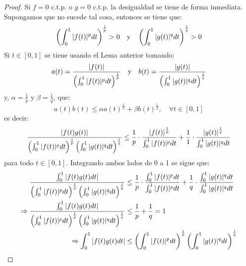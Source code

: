 \documentclass[twoside,12pt,a4 paper,openright]{book}
\begin{document}
\begin{enumerate}
    \begin{proof}
        Si $f=0$ c.t.p. o $g=0$ c.t.p. la desigualdad se tiene de forma inmediata. Supongamos que no sucede tal cosa, entonces se tiene que:
        \begin{equation*}
            \left(\int_0^1|f(t)|^p dt\right) ^{\frac{1}{p}}>0\quad\textup{y}\quad\left(\int_0^1 |g(t)|^q dt\right) ^{\frac{1}{q}}>0
        \end{equation*}
        Si $t\in[0,1]$ se tiene usando el Lema anterior tomando:
        \begin{equation*}
            a(t)=\frac{\left|f(t)\right|}{\left(\int_0^1|f(t)|^p dt\right) ^{\frac{1}{p}}}\quad\textup{y}\quad b(t)=\frac{\left|g(t)\right|}{\left(\int_0^1 |g(t)|^q dt\right) ^{\frac{1}{q}}}
        \end{equation*}
        y, $\alpha=\frac{1}{p}$ y $\beta=\frac{1}{q}$, que:
        \begin{equation*}
            a(t)b(t)\leq\alpha a(t)^{\frac{1}{\alpha}}+\beta b(t)^{\frac{1}{\beta}},\quad\forall t\in[0,1]
        \end{equation*}
        es decir:
        \begin{equation*}
            \frac{\left|f(t)g(t)\right|}{\left(\int_0^1|f(t)|^p dt\right) ^{\frac{1}{p}}\left(\int_0^1 |g(t)|^q dt\right) ^{\frac{1}{q}}}\leq\frac{1}{p}\cdot\frac{\left|f(t)\right|^{\frac{1}{p}}}{\int_0^1|f(t)|^p dt}+\frac{1}{1}\cdot\frac{\left|g(t)\right|^{\frac{1}{q}}}{\int_0^1|g(t)|^q dt}
        \end{equation*}
        para todo $t\in[0,1]$. Integrando ambos lados de 0 a 1 se sigue que:
        \begin{equation*}
            \begin{split}
                \frac{\int_{0}^{1}\left|f(t)g(t)dt\right|}{\left(\int_0^1|f(t)|^p dt\right) ^{\frac{1}{p}}\left(\int_0^1 |g(t)|^q dt\right) ^{\frac{1}{q}}}&\leq\frac{1}{p}\cdot\frac{\int_0^1|f(t)|^p dt}{\int_0^1|f(t)|^p dt}+\frac{1}{q}\cdot\frac{\int_0^1|g(t)|^q dt}{\int_0^1|g(t)|^q dt}\\
                \Rightarrow \frac{\int_{0}^{1}\left|f(t)g(t)dt\right|}{\left(\int_0^1|f(t)|^p dt\right) ^{\frac{1}{p}}\left(\int_0^1 |g(t)|^q dt\right) ^{\frac{1}{q}}}&\leq\frac{1}{p}+\frac{1}{q}=1\\
                \Rightarrow\int_{0}^{1}\left|f(t)g(t)dt\right|&\leq\left(\int_0^1|f(t)|^p dt\right) ^{\frac{1}{p}}\left(\int_0^1 |g(t)|^q dt\right) ^{\frac{1}{q}}\\
            \end{split}
        \end{equation*}
    \end{proof}


\end{enumerate}
\end{document}
